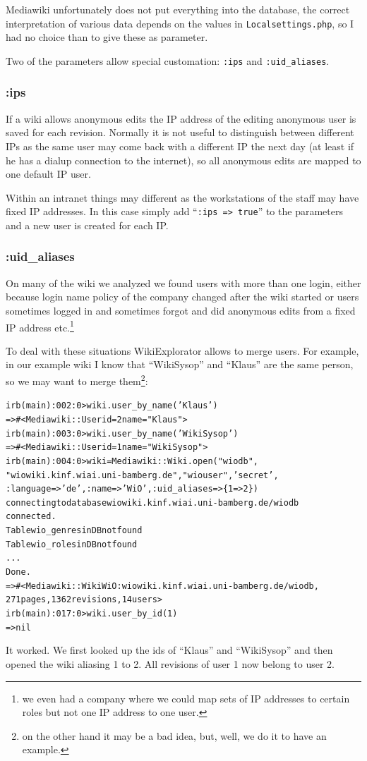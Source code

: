 \documentclass[a4paper]{scrartcl}
\newcounter{tcounter}
\newcommand{\tcount}{\makebox[0pt][r]{\tiny\thetcounter~}}
\newenvironment{typed}{\refstepcounter{tcounter}\bgroup\setlength{\topsep}{0pt}\renewcommand{\FrameCommand}[1]{\fcolorbox{black!30}{bgcolor}{##1}\tcount}\MakeFramed{\FrameRestore}\begin{alltt}\small}{\end{alltt}\endMakeFramed\egroup\par\aftergroup\noindent\aftergroup\ignorespaces}
\newcommand{\file}[1]{\texttt{\color{file}#1}}
\newcommand{\cmd}[1]{\texttt{\color{cmd}#1}}
\newcommand{\p}{\textcolor{prompt}}
\renewcommand{\c}{\textcolor{cmd}}
\begin{document}
Mediawiki unfortunately does not put everything into the database,
the correct interpretation of various data depends on the values in
\file{Localsettings.php}, so I had no choice than to give these as
parameter. 

Two of the parameters allow special customation: \cmd{:ips} and
\cmd{:uid\_aliases}.

\subsubsection{:ips}
\label{sec:ips}

If a wiki allows anonymous edits the IP address of the editing
anonymous user is saved for each revision. Normally it is not useful
to distinguish between different IPs as the same user may come back
with a different IP the next day (at least if he has a dialup
connection to the internet), so all anonymous edits are mapped to one
default IP user.

Within an intranet things may different as the workstations of the
staff may have fixed IP addresses. In this case simply add ``\cmd{:ips
=> true}'' to the parameters and a new user is created for each IP.

\subsubsection{:uid\_aliases}
\label{sec:uid_aliases}

On many of the wiki we analyzed we found users with more than one
login, either because login name policy of the company changed after
the wiki started or users sometimes logged in and sometimes forgot and
did anonymous edits from a fixed IP address etc.\footnote{we even had
  a company where we could map sets of IP addresses to certain roles
  but not one IP address to one user.}

To deal with these situations WikiExplorator allows to merge
users. For example, in our example wiki I know that ``WikiSysop'' and
``Klaus'' are the same person, so we may want to merge
them\footnote{on the other hand it may be a bad idea, but, well, we do
  it to have an example.}:
\begin{typed}
\p{irb(main):002:0>} \c{wiki.user_by_name('Klaus')}
=> #<Mediawiki::User id=2 name="Klaus">
\p{irb(main):003:0>} \c{wiki.user_by_name('WikiSysop')}
=> #<Mediawiki::User id=1 name="WikiSysop">
\p{irb(main):004:0>} \c{wiki = Mediawiki::Wiki.open("wiodb", 
                    "wiowiki.kinf.wiai.uni-bamberg.de", "wiouser", 'secret',
                    :language => 'de', :name => 'WiO', :uid_aliases => \{1 => 2\})}
connecting to database wiowiki.kinf.wiai.uni-bamberg.de/wiodb
connected.
Table wio_genres in DB not found
Table wio_roles in DB not found
...
Done.
=> #<Mediawiki::Wiki WiO: wiowiki.kinf.wiai.uni-bamberg.de/wiodb, 
\hfill 271 pages, 1362 revisions, 14 users>
\p{irb(main):017:0>} \c{wiki.user_by_id(1)}
=> nil
\end{typed}
It worked. We first looked up the ids of ``Klaus'' and ``WikiSysop''
and then opened the wiki aliasing 1 to 2. All revisions of user 1 now
belong to user 2.
\end{document}
